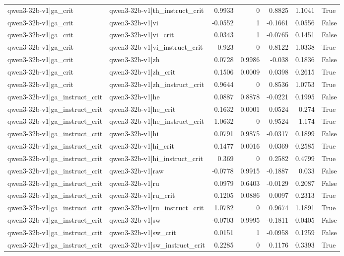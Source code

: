 \begin{table}
\begin{tabular}{l l r r r r l}
qwen3-32b-v1|ga_crit & qwen3-32b-v1|th_instruct_crit & 0.9933 & 0 & 0.8825 & 1.1041 & True \\
qwen3-32b-v1|ga_crit & qwen3-32b-v1|vi & -0.0552 & 1 & -0.1661 & 0.0556 & False \\
qwen3-32b-v1|ga_crit & qwen3-32b-v1|vi_crit & 0.0343 & 1 & -0.0765 & 0.1451 & False \\
qwen3-32b-v1|ga_crit & qwen3-32b-v1|vi_instruct_crit & 0.923 & 0 & 0.8122 & 1.0338 & True \\
qwen3-32b-v1|ga_crit & qwen3-32b-v1|zh & 0.0728 & 0.9986 & -0.038 & 0.1836 & False \\
qwen3-32b-v1|ga_crit & qwen3-32b-v1|zh_crit & 0.1506 & 0.0009 & 0.0398 & 0.2615 & True \\
qwen3-32b-v1|ga_crit & qwen3-32b-v1|zh_instruct_crit & 0.9644 & 0 & 0.8536 & 1.0753 & True \\
qwen3-32b-v1|ga_instruct_crit & qwen3-32b-v1|he & 0.0887 & 0.8878 & -0.0221 & 0.1995 & False \\
qwen3-32b-v1|ga_instruct_crit & qwen3-32b-v1|he_crit & 0.1632 & 0.0001 & 0.0524 & 0.274 & True \\
qwen3-32b-v1|ga_instruct_crit & qwen3-32b-v1|he_instruct_crit & 1.0632 & 0 & 0.9524 & 1.174 & True \\
qwen3-32b-v1|ga_instruct_crit & qwen3-32b-v1|hi & 0.0791 & 0.9875 & -0.0317 & 0.1899 & False \\
qwen3-32b-v1|ga_instruct_crit & qwen3-32b-v1|hi_crit & 0.1477 & 0.0016 & 0.0369 & 0.2585 & True \\
qwen3-32b-v1|ga_instruct_crit & qwen3-32b-v1|hi_instruct_crit & 0.369 & 0 & 0.2582 & 0.4799 & True \\
qwen3-32b-v1|ga_instruct_crit & qwen3-32b-v1|raw & -0.0778 & 0.9915 & -0.1887 & 0.033 & False \\
qwen3-32b-v1|ga_instruct_crit & qwen3-32b-v1|ru & 0.0979 & 0.6403 & -0.0129 & 0.2087 & False \\
qwen3-32b-v1|ga_instruct_crit & qwen3-32b-v1|ru_crit & 0.1205 & 0.0886 & 0.0097 & 0.2313 & True \\
qwen3-32b-v1|ga_instruct_crit & qwen3-32b-v1|ru_instruct_crit & 1.0782 & 0 & 0.9674 & 1.1891 & True \\
qwen3-32b-v1|ga_instruct_crit & qwen3-32b-v1|sw & -0.0703 & 0.9995 & -0.1811 & 0.0405 & False \\
qwen3-32b-v1|ga_instruct_crit & qwen3-32b-v1|sw_crit & 0.0151 & 1 & -0.0958 & 0.1259 & False \\
qwen3-32b-v1|ga_instruct_crit & qwen3-32b-v1|sw_instruct_crit & 0.2285 & 0 & 0.1176 & 0.3393 & True \\

\end{tabular}
\end{table}
